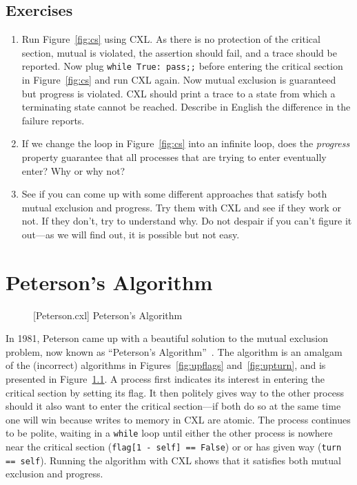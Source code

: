 \documentclass{report}
\newenvironment{code}{
\tcolorbox
}{
\endtcolorbox
}
\begin{document}
\section*{Exercises}
\begin{enumerate}
\item Run Figure~\ref{fig:cs} using CXL.  As there is no protection of the critical
section, mutual is violated, the assertion should fail, and a trace should be reported.
Now plug \texttt{while True: pass;;} before entering the critical section
in Figure~\ref{fig:cs} and run CXL again.  Now mutual exclusion is guaranteed but
progress is violated.  CXL should print a trace
to a state from which a terminating state cannot be reached.
Describe in English the difference in the failure reports.
\item If we change the loop in Figure~\ref{fig:cs} into an infinite loop,
does the \emph{progress} property guarantee that all processes that are trying
to enter eventually enter?  Why or why not?
\item See if you can come up with some different approaches that satisfy both
mutual exclusion and progress.  Try them with CXL and see if they work or not.
If they don't, try to understand why.
Do not despair if you can't figure it out---as
we will find out, it is possible but not easy.
\end{enumerate}

\chapter{Peterson's Algorithm}
\label{ch:peterson}

\begin{figure}
\begin{code}
\end{code}
\caption{[Peterson.cxl] Peterson's Algorithm}
\label{fig:peterson}
\end{figure}

In 1981, Peterson came up with a beautiful solution to the mutual exclusion
problem, now known as ``Peterson's Algorithm''~\cite{Peterson81}.
The algorithm is an amalgam of the (incorrect) algorithms in
Figures~\ref{fig:upflags} and~\ref{fig:upturn}, and is presented
in Figure~\ref{fig:peterson}.
A process first indicates its interest in entering the critical section
by setting its flag.
It then politely gives way to the other process should it also want to
enter the critical section---if both do so at the same time one will
win because writes to memory in CXL are atomic.
The process continues to be polite, waiting in a \texttt{while} loop
until either the other process is nowhere near the critical section
(\texttt{flag[1 - self] == False}) or or has given way
(\texttt{turn == self}).
Running the algorithm with CXL shows that it satisfies both mutual
exclusion and progress.
\end{document}

